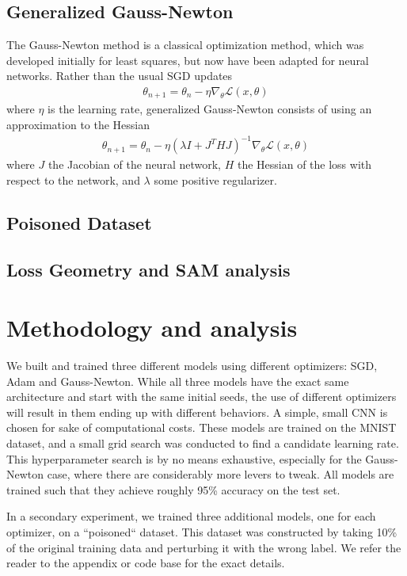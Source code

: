 \documentclass{article}
\begin{document}
    \subsection{Generalized Gauss-Newton}
    The Gauss-Newton method is a classical optimization method, which was developed initially for least squares, but now have been adapted for neural networks.
    Rather than the usual SGD updates
    \begin{align*}
        \theta_{n+1} = \theta_n - \eta \nabla_{\theta} \mathcal L(x, \theta)
    \end{align*}
    where $\eta$ is the learning rate, generalized Gauss-Newton consists of using an approximation to the Hessian
    \begin{align*}
        \theta_{n+1} = \theta_n - \eta (\lambda I + J^THJ)^{-1} \nabla_{\theta} \mathcal L(x, \theta)
    \end{align*}
    where $J$ the Jacobian of the neural network, $H$ the Hessian of the loss with respect to the network, and $\lambda$ some positive regularizer.

    \subsection{Poisoned Dataset}

    \subsection{Loss Geometry and SAM analysis}


    \section{Methodology and analysis}
    We built and trained three different models using different optimizers: SGD, Adam and Gauss-Newton.
    While all three models have the exact same architecture and start with the same initial seeds, the use of different optimizers will result in them ending up with different behaviors.
    A simple, small CNN is chosen for sake of computational costs.
    These models are trained on the MNIST dataset, and a small grid search was conducted to find a candidate learning rate.
    This hyperparameter search is by no means exhaustive, especially for the Gauss-Newton case, where there are considerably more levers to tweak.
    All models are trained such that they achieve roughly 95\% accuracy on the test set.

    In a secondary experiment, we trained three additional models, one for each optimizer, on a ``poisoned`` dataset.
    This dataset was constructed by taking 10\% of the original training data and perturbing it with the wrong label.
    We refer the reader to the appendix or code base for the exact details.
\end{document}
